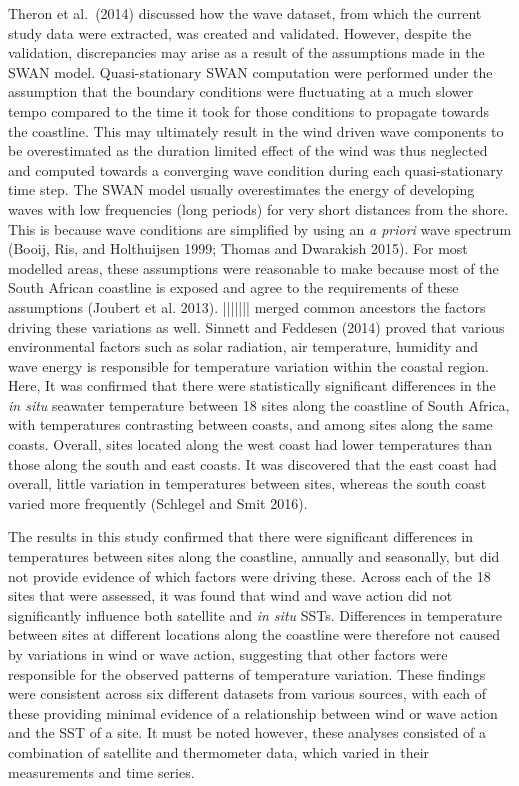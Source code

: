 \documentclass[12pt,A4paper,]{article}
\begin{document}
Theron et al.~(2014) discussed how the wave dataset, from which the
current study data were extracted, was created and validated. However,
despite the validation, discrepancies may arise as a result of the
assumptions made in the SWAN model. Quasi-stationary SWAN computation
were performed under the assumption that the boundary conditions were
fluctuating at a much slower tempo compared to the time it took for
those conditions to propagate towards the coastline. This may ultimately
result in the wind driven wave components to be overestimated as the
duration limited effect of the wind was thus neglected and computed
towards a converging wave condition during each quasi-stationary time
step. The SWAN model usually overestimates the energy of developing
waves with low frequencies (long periods) for very short distances from
the shore. This is because wave conditions are simplified by using an
\emph{a priori} wave spectrum (Booij, Ris, and Holthuijsen 1999; Thomas
and Dwarakish 2015). For most modelled areas, these assumptions were
reasonable to make because most of the South African coastline is
exposed and agree to the requirements of these assumptions (Joubert et
al. 2013).
||||||| merged common ancestors
the factors driving these variations as well. Sinnett and Feddesen
(2014) proved that various environmental factors such as solar
radiation, air temperature, humidity and wave energy is responsible for
temperature variation within the coastal region. Here, It was confirmed
that there were statistically significant differences in the \emph{in
situ} seawater temperature between 18 sites along the coastline of South
Africa, with temperatures contrasting between coasts, and among sites
along the same coasts. Overall, sites located along the west coast had
lower temperatures than those along the south and east coasts. It was
discovered that the east coast had overall, little variation in
temperatures between sites, whereas the south coast varied more
frequently (Schlegel and Smit 2016).

The results in this study confirmed that there were significant
differences in temperatures between sites along the coastline, annually
and seasonally, but did not provide evidence of which factors were
driving these. Across each of the 18 sites that were assessed, it was
found that wind and wave action did not significantly influence both
satellite and \emph{in situ} SSTs. Differences in temperature between
sites at different locations along the coastline were therefore not
caused by variations in wind or wave action, suggesting that other
factors were responsible for the observed patterns of temperature
variation. These findings were consistent across six different datasets
from various sources, with each of these providing minimal evidence of a
relationship between wind or wave action and the SST of a site. It must
be noted however, these analyses consisted of a combination of satellite
and thermometer data, which varied in their measurements and time
series.
\end{document}
